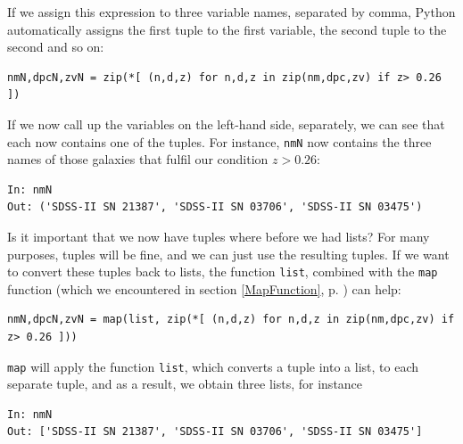 \documentclass[twocolumn,apj]{openjournal}
\begin{document}
If we assign this expression to three variable names, separated by comma, Python automatically assigns the first tuple to the first variable, the second tuple to the second and so on:
\begin{lstlisting}
nmN,dpcN,zvN = zip(*[ (n,d,z) for n,d,z in zip(nm,dpc,zv) if z> 0.26 ])
 \end{lstlisting}
If we now call up the variables on the left-hand side, separately, we can see that each now contains one of the tuples. For instance, \verb|nmN| now contains the three names of those galaxies that fulfil our condition $z>0.26$:
\begin{lstlisting}
In: nmN
Out: ('SDSS-II SN 21387', 'SDSS-II SN 03706', 'SDSS-II SN 03475')
 \end{lstlisting}
Is it important that we now have tuples where before we had lists? For many purposes, tuples will be fine, and we can just use the resulting tuples. If we want to convert these tuples back to lists, the function \verb|list|, combined with the \verb|map| function (which we encountered in section \ref{MapFunction}, p. \pageref{MapFunction}) can help:
\begin{lstlisting}
nmN,dpcN,zvN = map(list, zip(*[ (n,d,z) for n,d,z in zip(nm,dpc,zv) if z> 0.26 ]))
 \end{lstlisting}
\verb|map| will apply the function \verb|list|, which converts a tuple into a list, to each separate tuple, and as a result, we obtain three lists, for instance
\begin{lstlisting}
In: nmN
Out: ['SDSS-II SN 21387', 'SDSS-II SN 03706', 'SDSS-II SN 03475']
\end{lstlisting}
\end{document}
